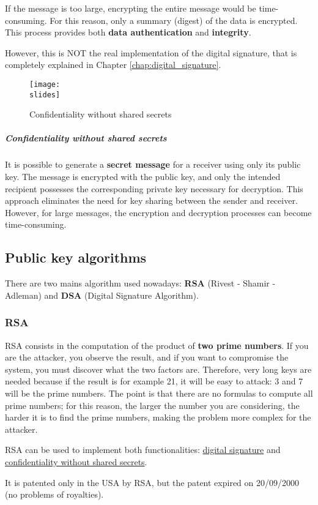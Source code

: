 If the message is too large, encrypting the entire message would be time-consuming. For this reason, only a summary (digest) of the data is encrypted. This process provides both \textbf{data authentication} and \textbf{integrity}.

However, this is NOT the real implementation of the digital signature, that is completely explained in Chapter \ref{chap:digital_signature}. 
\begin{figure}[h]
    \centering
    \texttt{[image: \\slides]}
    \caption{Confidentiality without shared secrets}
\end{figure}

\subparagraph{Confidentiality without shared secrets}
It is possible to generate a \textbf{secret message} for a receiver using only its public key.
The message is encrypted with the public key, and only the intended recipient possesses the corresponding private key necessary for decryption.
This approach eliminates the need for key sharing between the sender and receiver.
However, for large messages, the encryption and decryption processes can become time-consuming.

\subsection{Public key algorithms}
There are two mains algorithm used nowadays: \textbf{RSA} (Rivest - Shamir - Adleman) and \textbf{DSA} (Digital Signature
Algorithm).

\subsubsection{RSA}
RSA consists in the computation of the product of \textbf{two prime numbers}. If you are the attacker, you observe the
result, and if you want to compromise the system, you must discover what the two factors are. Therefore, very long
keys are needed because if the result is for example 21, it will be easy to attack: 3 and 7 will be the prime numbers. The point is that there are no formulas to compute all prime numbers; for this reason, the larger the number you
are considering, the harder it is to find the prime numbers, making the problem more complex for the attacker.

RSA can be used to implement both functionalities: \ul{digital signature} and \ul{confidentiality without shared secrets}.

It is patented only in the USA
by RSA, but the patent expired on 20/09/2000 (no problems of royalties).


